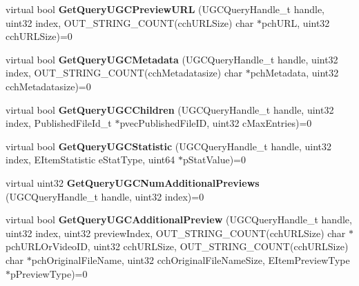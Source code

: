 \begin{DoxyCompactItemize}
\item 
\mbox{\label{class_i_steam_u_g_c_a537e35498178fde3bafda2d7c798370e}} 
virtual bool {\bfseries Get\+Query\+U\+G\+C\+Preview\+U\+RL} (U\+G\+C\+Query\+Handle\+\_\+t handle, uint32 index, O\+U\+T\+\_\+\+S\+T\+R\+I\+N\+G\+\_\+\+C\+O\+U\+NT(cch\+U\+R\+L\+Size) char $\ast$pch\+U\+RL, uint32 cch\+U\+R\+L\+Size)=0
\item 
\mbox{\label{class_i_steam_u_g_c_ab9821f0170bfdaf5127f48f00f8f3b8b}} 
virtual bool {\bfseries Get\+Query\+U\+G\+C\+Metadata} (U\+G\+C\+Query\+Handle\+\_\+t handle, uint32 index, O\+U\+T\+\_\+\+S\+T\+R\+I\+N\+G\+\_\+\+C\+O\+U\+NT(cch\+Metadatasize) char $\ast$pch\+Metadata, uint32 cch\+Metadatasize)=0
\item 
\mbox{\label{class_i_steam_u_g_c_a6ecccbfb655436c3fa0b9936da4400a7}} 
virtual bool {\bfseries Get\+Query\+U\+G\+C\+Children} (U\+G\+C\+Query\+Handle\+\_\+t handle, uint32 index, Published\+File\+Id\+\_\+t $\ast$pvec\+Published\+File\+ID, uint32 c\+Max\+Entries)=0
\item 
\mbox{\label{class_i_steam_u_g_c_ac976c9770dcf4a01b98264a02bc6474b}} 
virtual bool {\bfseries Get\+Query\+U\+G\+C\+Statistic} (U\+G\+C\+Query\+Handle\+\_\+t handle, uint32 index, E\+Item\+Statistic e\+Stat\+Type, uint64 $\ast$p\+Stat\+Value)=0
\item 
\mbox{\label{class_i_steam_u_g_c_ae12da428d261f099499b3bb4d2db1178}} 
virtual uint32 {\bfseries Get\+Query\+U\+G\+C\+Num\+Additional\+Previews} (U\+G\+C\+Query\+Handle\+\_\+t handle, uint32 index)=0
\item 
\mbox{\label{class_i_steam_u_g_c_a2d17967d704d4b4ec018f4821403d13f}} 
virtual bool {\bfseries Get\+Query\+U\+G\+C\+Additional\+Preview} (U\+G\+C\+Query\+Handle\+\_\+t handle, uint32 index, uint32 preview\+Index, O\+U\+T\+\_\+\+S\+T\+R\+I\+N\+G\+\_\+\+C\+O\+U\+NT(cch\+U\+R\+L\+Size) char $\ast$pch\+U\+R\+L\+Or\+Video\+ID, uint32 cch\+U\+R\+L\+Size, O\+U\+T\+\_\+\+S\+T\+R\+I\+N\+G\+\_\+\+C\+O\+U\+NT(cch\+U\+R\+L\+Size) char $\ast$pch\+Original\+File\+Name, uint32 cch\+Original\+File\+Name\+Size, E\+Item\+Preview\+Type $\ast$p\+Preview\+Type)=0
\item 
\mbox{\label{class_i_steam_u_g_c_a0c8db5d658fadb17321dd4ee1d225ff4}} 

\end{DoxyCompactItemize}
